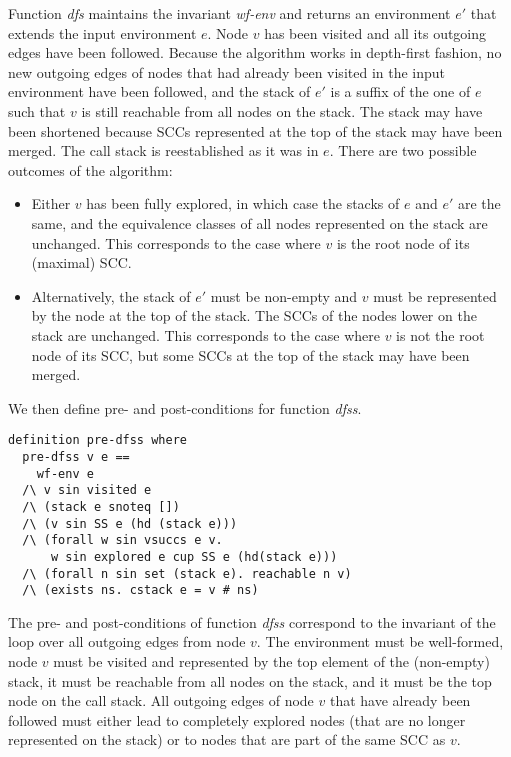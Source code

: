 \documentclass[sigplan,10pt,anonymous,review]{acmart}
\newcommand{\prog}[1]{\textit{#1}}
\begin{document}
Function \prog{dfs} maintains the invariant \prog{wf-env} and returns an environment $e'$ that extends the input environment $e$. Node $v$ has been visited and all its outgoing edges have been followed. Because the algorithm works in depth-first fashion, no new outgoing edges of nodes that had already been visited in the input environment have been followed, and the stack of $e'$ is a suffix of the one of $e$ such that $v$ is still reachable from all nodes on the stack. The stack may have been shortened because SCCs represented at the top of the stack may have been merged. The call stack is reestablished as it was in $e$. There are two possible outcomes of the algorithm:
\begin{itemize}
\item Either $v$ has been fully explored, in which case the stacks of $e$ and $e'$ are the same, and the equivalence classes of all nodes represented on the stack are unchanged. This corresponds to the case where $v$ is the root node of its (maximal) SCC.
\item Alternatively, the stack of $e'$ must be non-empty and $v$ must be represented by the node at the top of the stack. The SCCs of the nodes lower on the stack are unchanged. This corresponds to the case where $v$ is not the root node of its SCC, but some SCCs at the top of the stack may have been merged.
\end{itemize}

We then define pre- and post-conditions for function \prog{dfss}.

\begin{small}
\begin{lstlisting}[language=isabelle]
definition pre-dfss where 
  pre-dfss v e ==
    wf-env e 
  /\ v sin visited e
  /\ (stack e snoteq [])
  /\ (v sin SS e (hd (stack e)))
  /\ (forall w sin vsuccs e v.
      w sin explored e cup SS e (hd(stack e)))
  /\ (forall n sin set (stack e). reachable n v)
  /\ (exists ns. cstack e = v # ns)
\end{lstlisting}
\end{small}

The pre- and post-conditions of function \prog{dfss} correspond to the invariant of the loop over all outgoing edges from node $v$. The environment must be well-formed, node $v$ must be visited and represented by the top element of the (non-empty) stack, it must be reachable from all nodes on the stack, and it must be the top node on the call stack. All outgoing edges of node $v$ that have already been followed must either lead to completely explored nodes (that are no longer represented on the stack) or to nodes that are part of the same SCC as $v$.
\end{document}
